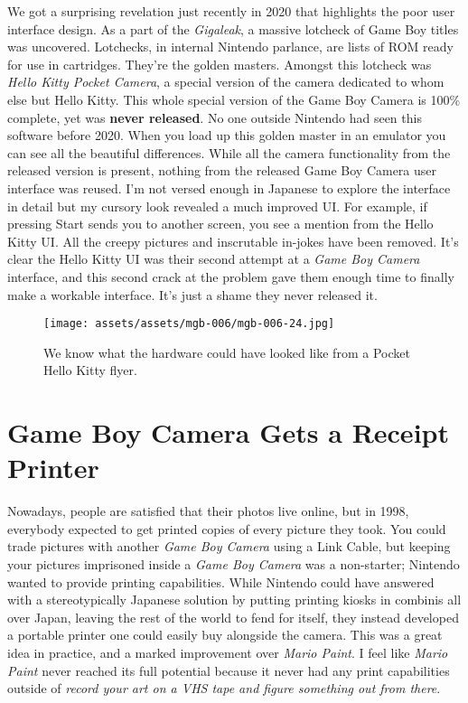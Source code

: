 \documentclass{book}
\begin{document}
We got a surprising revelation just recently in 2020 that highlights the poor user interface design. As a part of the \emph{Gigaleak}, a massive lotcheck of Game Boy titles was uncovered. Lotchecks, in internal Nintendo parlance, are lists of ROM ready for use in cartridges. They’re the golden masters. Amongst this lotcheck was \emph{Hello Kitty Pocket Camera}, a special version of the camera dedicated to whom else but Hello Kitty. This whole special version of the Game Boy Camera is 100\% complete, yet was \textbf{never released}. No one outside Nintendo had seen this software before 2020. When you load up this golden master in an emulator you can see all the beautiful differences. While all the camera functionality from the released version is present, nothing from the released Game Boy Camera user interface was reused. I’m not versed enough in Japanese to explore the interface in detail but my cursory look revealed a much improved UI. For example, if pressing Start sends you to another screen, you see a mention from the Hello Kitty UI. All the creepy pictures and inscrutable in-jokes have been removed. It’s clear the Hello Kitty UI was their second attempt at a \emph{Game Boy Camera} interface, and this second crack at the problem gave them enough time to finally make a workable interface. It’s just a shame they never released it.

\begin{figure}[hbt]
\vskip 10pt
\centering \texttt{[image: assets/assets/mgb-006/mgb-006-24.jpg]}\par\pagetwodescription We know what the hardware could have looked like from a Pocket Hello Kitty flyer.
\vskip 6pt
\end{figure}

\FloatBarrier\needspace{10mm}\section*{Game Boy Camera Gets a Receipt Printer}\nopagebreak[4]

Nowadays, people are satisfied that their photos live online, but in 1998, everybody expected to get printed copies of every picture they took. You could trade pictures with another \emph{Game Boy Camera} using a Link Cable, but keeping your pictures imprisoned inside a \emph{Game Boy Camera} was a non-starter; Nintendo wanted to provide printing capabilities. While Nintendo could have answered with a stereotypically Japanese solution by putting printing kiosks in combinis all over Japan, leaving the rest of the world to fend for itself, they instead developed a portable printer one could easily buy alongside the camera. This was a great idea in practice, and a marked improvement over \emph{Mario Paint}. I feel like \emph{Mario Paint} never reached its full potential because it never had any print capabilities outside of \emph{record your art on a VHS tape and figure something out from there}.
\end{document}
